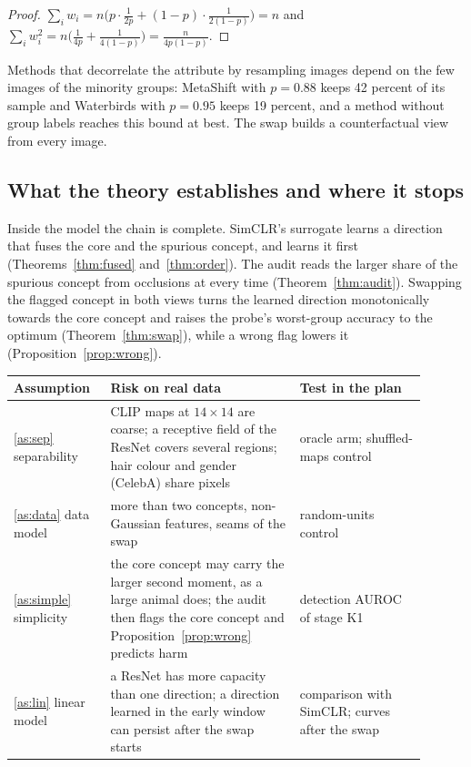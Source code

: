 \documentclass[11pt]{article}
\theoremstyle{definition}
\theoremstyle{remark}
\begin{document}
\begin{proof}
$\sum_iw_i=n\big(p\cdot\tfrac{1}{2p}+(1-p)\cdot\tfrac{1}{2(1-p)}\big)=n$ and
$\sum_iw_i^2=n\big(\tfrac{1}{4p}+\tfrac{1}{4(1-p)}\big)=\tfrac{n}{4p(1-p)}$.
\end{proof}

Methods that decorrelate the attribute by resampling images depend on the few images of the minority groups:
MetaShift with $p=0.88$ keeps 42 percent of its sample and Waterbirds with $p=0.95$ keeps 19 percent, and a method
without group labels reaches this bound at best. The swap builds a counterfactual view from every image.

\subsection{What the theory establishes and where it stops}\label{sec:scope}

Inside the model the chain is complete. SimCLR's surrogate learns a direction that fuses the core and the spurious
concept, and learns it first (Theorems~\ref{thm:fused} and~\ref{thm:order}). The audit reads the larger share of the
spurious concept from occlusions at every time (Theorem~\ref{thm:audit}). Swapping the flagged concept in both views
turns the learned direction monotonically towards the core concept and raises the probe's worst-group accuracy to
the optimum (Theorem~\ref{thm:swap}), while a wrong flag lowers it (Proposition~\ref{prop:wrong}).

\begin{center}
\begin{tabular}{p{0.20\linewidth}p{0.42\linewidth}p{0.28\linewidth}}
\toprule
Assumption & Risk on real data & Test in the plan \\
\midrule
\ref{as:sep} separability & CLIP maps at $14\times14$ are coarse; a receptive field of the ResNet covers several
regions; hair colour and gender (CelebA) share pixels & oracle arm; shuffled-maps control \\
\ref{as:data} data model & more than two concepts, non-Gaussian features, seams of the swap & random-units control \\
\ref{as:simple} simplicity & the core concept may carry the larger second moment, as a large animal does; the audit
then flags the core concept and Proposition~\ref{prop:wrong} predicts harm & detection AUROC of stage K1 \\
\ref{as:lin} linear model & a ResNet has more capacity than one direction; a direction learned in the early window can
persist after the swap starts & comparison with SimCLR; curves after the swap \\
\bottomrule
\end{tabular}
\end{center}
\end{document}
